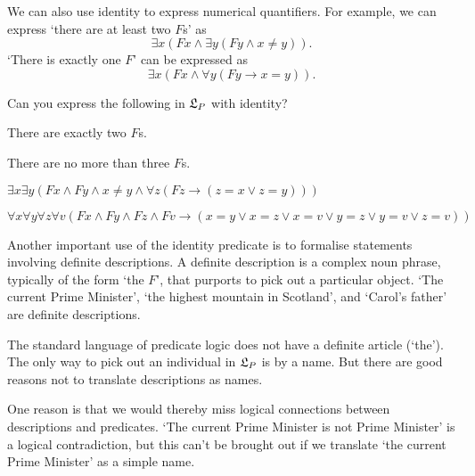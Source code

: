 We can also use identity to express numerical quantifiers. For example, we can
express `there are at least two $F$s' as
\[
  \exists x(Fx \land \exists y(Fy \land x\not=y)).
\]
`There is exactly one $F$' can be expressed as
\[
  \exists x(Fx \land \forall y(Fy \to x\!=\!y)).
\]

\begin{exercise}
  Can you express the following in $\mathfrak{L}_P$ with identity?
  \begin{exlist}
  \item There are exactly two $F$s.
  \item There are no more than three $F$s.
  \end{exlist}
\end{exercise}
\begin{solution}
  \begin{sollist}
  \item $\exists x \exists y(Fx \land Fy \land x\not=y \land \forall z(Fz \to (z=x \lor z=y)))$
  \item $\forall x \forall y\forall z\forall v(Fx \land Fy \land Fz \land Fv \to (x=y \lor x=z \lor x=v \lor y=z \lor y=v \lor z=v))$
  \end{sollist}
\end{solution}

Another important use of the identity predicate is to formalise statements
involving definite descriptions. A definite description is a complex noun
phrase, typically of the form `the $F$', that purports to pick out a particular
object. `The current Prime Minister', `the highest mountain in Scotland', and
`Carol's father' are definite descriptions.

The standard language of predicate logic does not have a definite article
(`the'). The only way to pick out an individual in $\mathfrak{L}_P$ is by a name. But
there are good reasons not to translate descriptions as names.

One reason is that we would thereby miss logical connections between
descriptions and predicates. `The current Prime Minister is not Prime Minister'
is a logical contradiction, but this can't be brought out if we translate `the
current Prime Minister' as a simple name.


